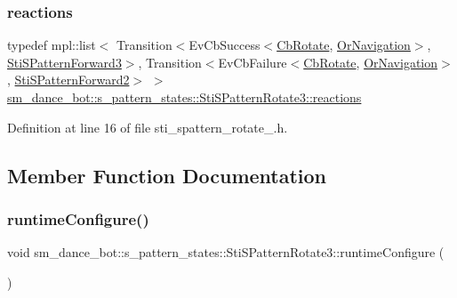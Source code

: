 \subsubsection{\texorpdfstring{reactions}{reactions}}
{\footnotesize\ttfamily typedef mpl\+::list$<$ Transition$<$Ev\+Cb\+Success$<$\hyperlink{classcl__move__base__z_1_1CbRotate}{Cb\+Rotate}, \hyperlink{classsm__dance__bot_1_1OrNavigation}{Or\+Navigation}$>$, \hyperlink{structsm__dance__bot_1_1s__pattern__states_1_1StiSPatternForward3}{Sti\+S\+Pattern\+Forward3}$>$, Transition$<$Ev\+Cb\+Failure$<$\hyperlink{classcl__move__base__z_1_1CbRotate}{Cb\+Rotate}, \hyperlink{classsm__dance__bot_1_1OrNavigation}{Or\+Navigation}$>$, \hyperlink{structsm__dance__bot_1_1s__pattern__states_1_1StiSPatternForward2}{Sti\+S\+Pattern\+Forward2}$>$ $>$ \hyperlink{structsm__dance__bot_1_1s__pattern__states_1_1StiSPatternRotate3_a3c3103ecfffa5e136b58610b4906045a}{sm\+\_\+dance\+\_\+bot\+::s\+\_\+pattern\+\_\+states\+::\+Sti\+S\+Pattern\+Rotate3\+::reactions}}



Definition at line 16 of file sti\+\_\+spattern\+\_\+rotate\+\_.\+h.



\subsection{Member Function Documentation}
\mbox{\label{structsm__dance__bot_1_1s__pattern__states_1_1StiSPatternRotate3_a7c594e66c0b34e5857a62b1d95d06fbd}} 
\subsubsection{\texorpdfstring{runtime\+Configure()}{runtimeConfigure()}}
{\footnotesize\ttfamily void sm\+\_\+dance\+\_\+bot\+::s\+\_\+pattern\+\_\+states\+::\+Sti\+S\+Pattern\+Rotate3\+::runtime\+Configure (\begin{DoxyParamCaption}{ }\end{DoxyParamCaption})\hspace{0.3cm}{\ttfamily [inline]}}



